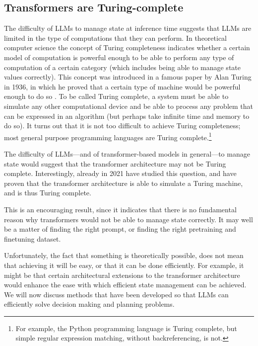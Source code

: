 \subsection{Transformers are Turing-complete}\label{sec:turing}
The difficulty of LLMs to manage state at inference time suggests that LLMs are limited in the type of computations that they can perform. %
In theoretical computer science the concept of Turing completeness indicates whether a certain model of computation is powerful enough to be able to perform any type of computation of a certain category (which includes being able to manage state values correctly). This concept was introduced in a famous paper by Alan Turing in 1936, in which he proved that a certain type of machine would be powerful enough to do so \citep{turing1936computable}. 
To be called Turing complete, a system must be able to simulate any other computational device and be able to process any problem that can be expressed in an algorithm (but perhaps take infinite time and memory to do so). 
It turns out that it is not too difficult to achieve  Turing completeness; most general purpose programming languages are Turing complete.\footnote{For example, the Python programming language is Turing complete, but simple regular expression matching, without backreferencing, is not.} 

The difficulty of LLMs---and of transformer-based models in general---to manage state would suggest that the transformer architecture may not be Turing complete. 
Interestingly, already in 2021 \citet{perez2021attention} have studied this question, and have proven that the transformer architecture is able to simulate a Turing machine, and is thus Turing complete.

This is an encouraging result, since it indicates that there is no fundamental reason why transformers would not be able to manage state correctly. It may well  be a matter of finding the right prompt, or finding the right pretraining and finetuning dataset. 

Unfortunately, the fact that something is theoretically possible, does not mean that achieving it will be easy, or that it can be done efficiently. %
For example, it might be that certain architectural extensions to the transformer architecture  would enhance the ease with which efficient state management can be achieved. 
We will now discuss methods that have been developed so that LLMs can efficiently solve  decision making and planning problems.


